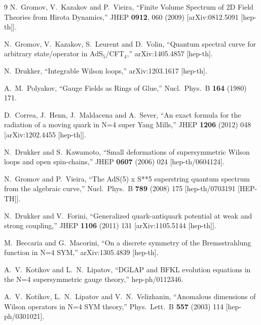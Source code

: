\documentclass[a4paper,11pt]{article}
\numberwithin{equation}{section}
\begin{document}
\begin{thebibliography} {9}
  N.~Gromov, V.~Kazakov and P.~Vieira,
  ``Finite Volume Spectrum of 2D Field Theories from Hirota Dynamics,''
  JHEP {\bf 0912}, 060 (2009)
  [arXiv:0812.5091 [hep-th]].

  N.~Gromov, V.~Kazakov, S.~Leurent and D.~Volin,
  ``Quantum spectral curve for arbitrary state/operator in AdS$_5$/CFT$_4$,''
  arXiv:1405.4857 [hep-th].

  N.~Drukker,
  ``Integrable Wilson loops,''
  arXiv:1203.1617 [hep-th].

  A.~M.~Polyakov,
  ``Gauge Fields as Rings of Glue,''
  Nucl.\ Phys.\ B {\bf 164} (1980) 171.

  D.~Correa, J.~Henn, J.~Maldacena and A.~Sever,
  ``An exact formula for the radiation of a moving quark in N=4 super Yang Mills,''
  JHEP {\bf 1206} (2012) 048
  [arXiv:1202.4455 [hep-th]].

  N.~Drukker and S.~Kawamoto,
  ``Small deformations of supersymmetric Wilson loops and open spin-chains,''
  JHEP {\bf 0607} (2006) 024
  [hep-th/0604124].

  N.~Gromov and P.~Vieira,
  ``The AdS(5) x S**5 superstring quantum spectrum from the algebraic curve,''
  Nucl.\ Phys.\ B {\bf 789} (2008) 175
  [hep-th/0703191 [HEP-TH]].

  N.~Drukker and V.~Forini,
  ``Generalized quark-antiquark potential at weak and strong coupling,''
  JHEP {\bf 1106} (2011) 131
  [arXiv:1105.5144 [hep-th]].

  M.~Beccaria and G.~Macorini,
  ``On a discrete symmetry of the Bremsstrahlung function in N=4 SYM,''
  arXiv:1305.4839 [hep-th].

  A.~V.~Kotikov and L.~N.~Lipatov,
  ``DGLAP and BFKL evolution equations in the N=4 supersymmetric gauge theory,''
  hep-ph/0112346.

  A.~V.~Kotikov, L.~N.~Lipatov and V.~N.~Velizhanin,
  ``Anomalous dimensions of Wilson operators in N=4 SYM theory,''
  Phys.\ Lett.\ B {\bf 557} (2003) 114
  [hep-ph/0301021].


\end{thebibliography}
\end{document}
